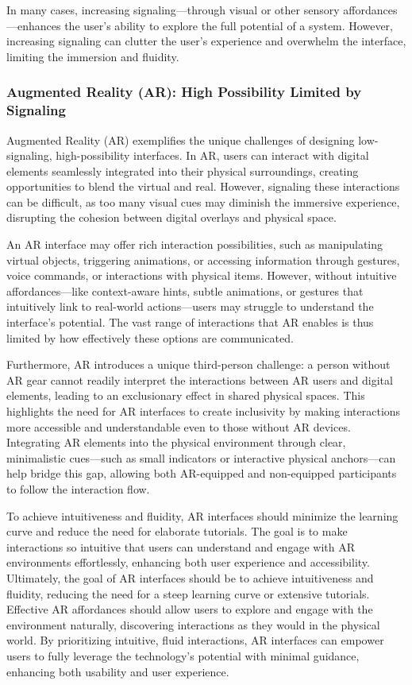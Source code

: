 In many cases, increasing signaling—through visual or other sensory affordances—enhances the user's ability to explore the full potential of a system.
However, increasing signaling can clutter the user's experience and overwhelm the interface, limiting the immersion and fluidity.

\subsubsection{ Augmented Reality (AR): High Possibility Limited by Signaling}

Augmented Reality (AR) exemplifies the unique challenges of designing low-signaling, high-possibility interfaces\cite{10.1145/2254556.2254569}.
In AR, users can interact with digital elements seamlessly integrated into their physical surroundings, creating opportunities to blend the virtual and real.
However, signaling these interactions can be difficult, as too many visual cues may diminish the immersive experience, disrupting the cohesion between digital overlays and physical space.

An AR interface may offer rich interaction possibilities, such as manipulating virtual objects, triggering animations, or accessing information through gestures, voice commands, or interactions with physical items.
However, without intuitive affordances—like context-aware hints, subtle animations, or gestures that intuitively link to real-world actions—users may struggle to understand the interface’s potential.
The vast range of interactions that AR enables is thus limited by how effectively these options are communicated.

Furthermore, AR introduces a unique third-person challenge: a person without AR gear cannot readily interpret the interactions between AR users and digital elements, leading to an exclusionary effect in shared physical spaces.
This highlights the need for AR interfaces to create inclusivity by making interactions more accessible and understandable even to those without AR devices.
Integrating AR elements into the physical environment through clear, minimalistic cues—such as small indicators or interactive physical anchors—can help bridge this gap, allowing both AR-equipped and non-equipped participants to follow the interaction flow.

To achieve intuitiveness and fluidity, AR interfaces should minimize the learning curve and reduce the need for elaborate tutorials.
The goal is to make interactions so intuitive that users can understand and engage with AR environments effortlessly, enhancing both user experience and accessibility.
Ultimately, the goal of AR interfaces should be to achieve intuitiveness and fluidity, reducing the need for a steep learning curve or extensive tutorials.
Effective AR affordances should allow users to explore and engage with the environment naturally, discovering interactions as they would in the physical world.
By prioritizing intuitive, fluid interactions, AR interfaces can empower users to fully leverage the technology’s potential with minimal guidance, enhancing both usability and user experience.

